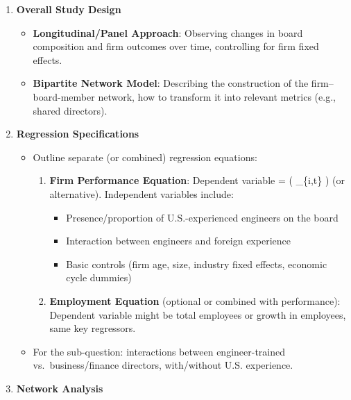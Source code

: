\documentclass[
]{article}
\providecommand{\tightlist}{%
  \setlength{\itemsep}{0pt}\setlength{\parskip}{0pt}}\usepackage{longtable,booktabs,array}
\begin{document}
\begin{enumerate}
\def\labelenumi{\arabic{enumi}.}
\tightlist
\item
  \textbf{Overall Study Design}

  \begin{itemize}
  \tightlist
  \item
    \textbf{Longitudinal/Panel Approach}: Observing changes in board
    composition and firm outcomes over time, controlling for firm fixed
    effects.\\
  \item
    \textbf{Bipartite Network Model}: Describing the construction of the
    firm--board-member network, how to transform it into relevant
    metrics (e.g., shared directors).
  \end{itemize}
\item
  \textbf{Regression Specifications}

  \begin{itemize}
  \tightlist
  \item
    Outline separate (or combined) regression equations:

    \begin{enumerate}
    \def\labelenumii{\arabic{enumii}.}
    \tightlist
    \item
      \textbf{Firm Performance Equation}: Dependent variable = (
      \_\{i,t\} ) (or alternative).
      Independent variables include:

      \begin{itemize}
      \tightlist
      \item
        Presence/proportion of U.S.-experienced engineers on the board\\
      \item
        Interaction between engineers and foreign experience\\
      \item
        Basic controls (firm age, size, industry fixed effects, economic
        cycle dummies)\\
      \end{itemize}
    \item
      \textbf{Employment Equation} (optional or combined with
      performance): Dependent variable might be total employees or
      growth in employees, same key regressors.\\
    \end{enumerate}
  \item
    For the sub-question: interactions between engineer-trained
    vs.~business/finance directors, with/without U.S. experience.
  \end{itemize}
\item
  \textbf{Network Analysis}


\end{enumerate}
\end{document}
